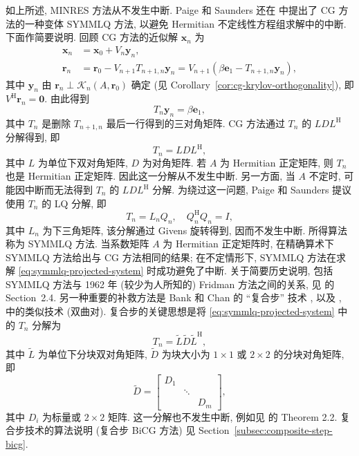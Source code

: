 {如上所述, MINRES 方法从不发生中断. Paige 和 Saunders 还在  中提出了 CG 方法的一种变体 SYMMLQ 方法, 以避免 Hermitian 不定线性方程组求解中的中断. 下面作简要说明. 回顾 CG 方法的近似解 $\bm x_n$ 为}
\[\begin{aligned}
\bm x_n&=\bm x_0+V_n\bm y_n,\\
\bm r_n&=\bm r_0-V_{n+1}T_{n+1,n}\bm y_n=V_{n+1}(\beta\bm e_1-T_{n+1,n}\bm y_n),
\end{aligned}\]
{其中 $\bm y_n$ 由 $\bm r_n\perp\mathcal K_n(A,\bm r_0)$ 确定 (见 Corollary\ \ref{cor:cg-krylov-orthogonality}), 即 $V^{\mathrm H}\bm r_n=\bm0$. 由此得到}
\begin{equation}\label{eq:symmlq-projected-system}T_n\bm y_n=\beta\bm e_1,\end{equation}
{其中 $T_n$ 是删除 $T_{n+1,n}$ 最后一行得到的三对角矩阵. CG 方法通过 $T_n$ 的 $LDL^{\mathrm H}$ 分解得到, 即}
\[T_n=LDL^{\mathrm H},\]
{其中 $L$ 为单位下双对角矩阵, $D$ 为对角矩阵. 若 $A$ 为 Hermitian 正定矩阵, 则 $T_n$ 也是 Hermitian 正定矩阵. 因此这一分解从不发生中断. 另一方面, 当 $A$ 不定时, 可能因中断而无法得到 $T_n$ 的 $LDL^{\mathrm H}$ 分解.}
{为绕过这一问题, Paige 和 Saunders 提议使用 $T_n$ 的 LQ 分解, 即}
\[T_n=L_nQ_n,\quad Q_n^{\mathrm H}Q_n=I,\]
{其中 $L_n$ 为下三角矩阵, 该分解通过 Givens 旋转得到, 因而不发生中断. 所得算法称为 \linebreak[4]SYMMLQ 方法. 当系数矩阵 $A$ 为 Hermitian 正定矩阵时, 在精确算术下 SYMMLQ 方法给出与 CG 方法相同的结果; 在不定情形下, SYMMLQ 方法在求解 \eqref{eq:symmlq-projected-system} 时成功避免了中断. 关于简要历史说明, 包括 SYMMLQ 方法与 1962 年 (较少为人所知的) Fridman 方法之间的关系, 见  的 Section\ 2.4.}
{另一种重要的补救方法是 Bank 和 Chan 的 ``复合步'' 技术 , 以及 ,  中的类似技术 (双曲对). 复合步的关键思想是将 \eqref{eq:symmlq-projected-system} 中的 $T_n$ 分解为}
\[T_n=\widetilde L\widetilde D\widetilde L^{\mathrm H},\]
{其中 $\widetilde L$ 为单位下分块双对角矩阵, $\widetilde D$ 为块大小为 $1\times1$ 或 $2\times2$ 的分块对角矩阵, 即}
\[\widetilde D=\begin{bmatrix}D_1&&\\&\ddots&\\&&D_m\end{bmatrix},\]
{其中 $D_i$ 为标量或 $2\times2$ 矩阵. 这一分解也不发生中断, 例如见  的 Theorem 2.2. 复合步技术的算法说明 (复合步 BiCG 方法) 见 Section\ \ref{subsec:composite-step-bicg}.}
